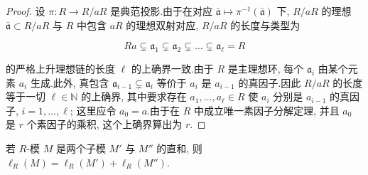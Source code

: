 \begin{proof}
设 $\pi \colon R \longrightarrow R/aR$ 是典范投影.由于在对应 $\bar{\mathfrak{a}} \longmapsto \pi^{-1}(\bar{\mathfrak{a}})$ 下, $R/aR$ 的理想 $\bar{\mathfrak{a}} \subset R/aR$ 与 $R$ 中包含 $aR$ 的理想双射对应, $R/aR$ 的长度与类型为

\[
Ra \subsetneq \mathfrak{a}_1 \subsetneq \mathfrak{a}_2 \subsetneq \ldots \subsetneq \mathfrak{a}_\ell = R\]

的严格上升理想链的长度 $\ell$ 的上确界一致.由于 $R$ 是主理想环, 每个 $\mathfrak{a}_i$ 由某个元素 $a_i$ 生成.此外, 真包含 $\mathfrak{a}_{i - 1} \subsetneq \mathfrak{a}_i$ 等价于 $a_i$ 是 $a_{i - 1}$ 的真因子.因此 $R/aR$ 的长度等于一切 $\ell \in \mathbb{N}$ 的上确界, 其中要求存在 $a_1, \ldots, a_\ell \in R$ 使 $a_i$ 分别是 $a_{i - 1}$ 的真因子, $i = 1, \ldots, \ell$; 这里应令 $a_0 = a$.由于在 $R$ 中成立唯一素因子分解定理, 并且 $a_0$ 是 $r$ 个素因子的乘积, 这个上确界算出为 $r$.
\end{proof}

\begin{lemma}\label{lem:6.3.3}
若 $R$-模 $M$ 是两个子模 $M'$ 与 $M''$ 的直和, 则 $\ell_R(M) = \ell_R(M') + \ell_R(M'')$.
\end{lemma}

